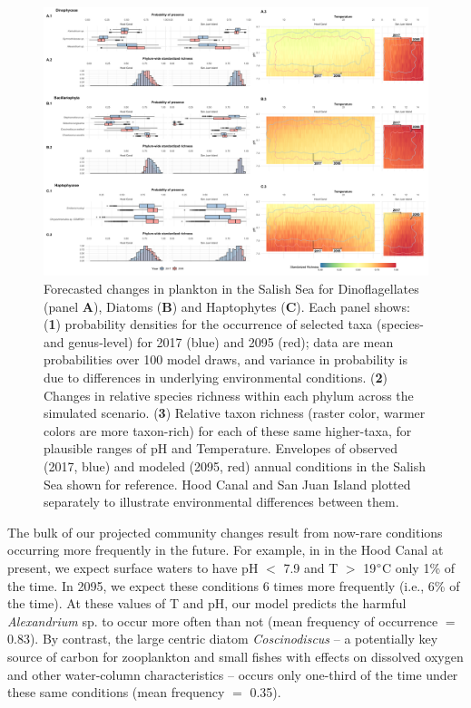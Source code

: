 \documentclass[11pt]{article}
\begin{document}
\begin{linenumbers}
 \begin{figure}
 \centering
 \includegraphics[width=1\linewidth]{Figures_for_MS/Fig3}
\caption{\footnotesize{Forecasted changes in plankton in the Salish Sea for Dinoflagellates (panel \textbf{A}), Diatoms (\textbf{B}) and Haptophytes (\textbf{C}). Each panel shows:  (\textbf{1}) probability densities for the occurrence of selected taxa (species- and genus-level) for 2017 (blue) and 2095 (red); data are mean probabilities over 100 model draws, and variance in probability is due to differences in underlying environmental conditions.  (\textbf{2}) Changes in relative species richness within each phylum across the simulated scenario. (\textbf{3}) Relative taxon richness (raster color, warmer colors are more taxon-rich) for each of these same higher-taxa, for plausible ranges of pH and Temperature. Envelopes of observed (2017, blue) and modeled (2095, red) annual conditions in the Salish Sea shown for reference. Hood Canal and San Juan Island plotted separately to illustrate environmental differences between them.}}

\label{fig:Fig3}
 \end{figure}
 
The bulk of our projected community changes result from now-rare conditions occurring more frequently in the future. For example, in in the Hood Canal at present, we expect surface waters to have pH $<$ 7.9 and T $>$ 19$\degree$C only 1\% of the time. In 2095, we expect these conditions 6 times more frequently (i.e., 6\% of the time). At these values of T and pH, our model predicts the harmful \textit{Alexandrium} sp. to occur more often than not (mean frequency of occurrence $=$ 0.83). By contrast, the large centric diatom \textit{Coscinodiscus} -- a potentially key source of carbon for zooplankton and small fishes \cite{pasquaud2010determination, zamon2002tidal} with effects on dissolved oxygen and other water-column characteristics \cite{manabe1991bloom} -- occurs only one-third of the time under these same conditions (mean frequency $=$ 0.35).


\end{linenumbers}
\end{document}
